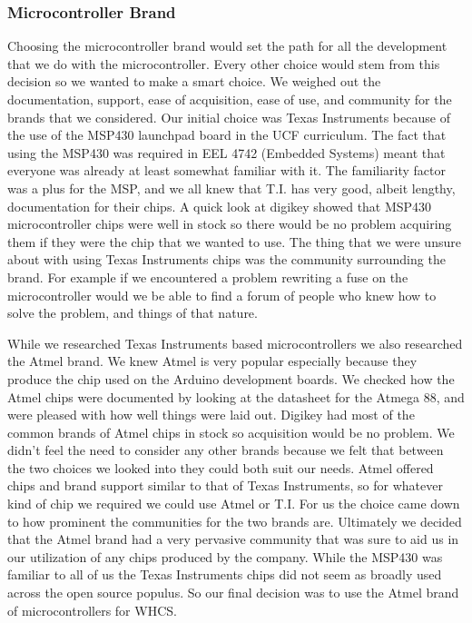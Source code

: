 \subsubsection{Microcontroller Brand}
Choosing the microcontroller brand would set the path for all the development
that we do with the microcontroller. Every other choice would stem from this
decision so we wanted to make a smart choice. We weighed out the documentation,
support, ease of acquisition, ease of use, and community for the brands that we
considered. Our initial choice was Texas Instruments because of the use of the
MSP430 launchpad board in the UCF curriculum. The fact that using the MSP430
was required in EEL 4742 (Embedded Systems) meant that everyone was already at
least somewhat familiar with it.  The familiarity factor was a plus for the
MSP, and we all knew that T.I. has very good, albeit lengthy, documentation for
their chips. A quick look at digikey showed that MSP430 microcontroller chips
were well in stock so there would be no problem acquiring them if they were the
chip that we wanted to use. The thing that we were unsure about with using
Texas Instruments chips was the community surrounding the brand. For example if
we encountered a problem rewriting a fuse on the microcontroller would we be
able to find a forum of people who knew how to solve the problem, and things of
that nature.

While we researched Texas Instruments based microcontrollers we also researched
the Atmel brand. We knew Atmel is very popular especially because they produce
the chip used on the Arduino development boards. We checked how the Atmel chips
were documented by looking at the datasheet for the Atmega 88, and were pleased
with how well things were laid out.  Digikey had most of the common brands of
Atmel chips in stock so acquisition would be no problem. We didn{}'t feel the
need to consider any other brands because we felt that between the two choices
we looked into they could both suit our needs. Atmel offered chips and brand
support similar to that of Texas Instruments, so for whatever kind of chip we
required we could use Atmel or T.I. For us the choice came down to how
prominent the communities for the two brands are. Ultimately we decided that
the Atmel brand had a very pervasive community that was sure to aid us in our
utilization of any chips produced by the company. While the MSP430 was familiar
to all of us the Texas Instruments chips did not seem as broadly used across
the open source populus. So our final decision was to use the Atmel brand of
microcontrollers for WHCS.

